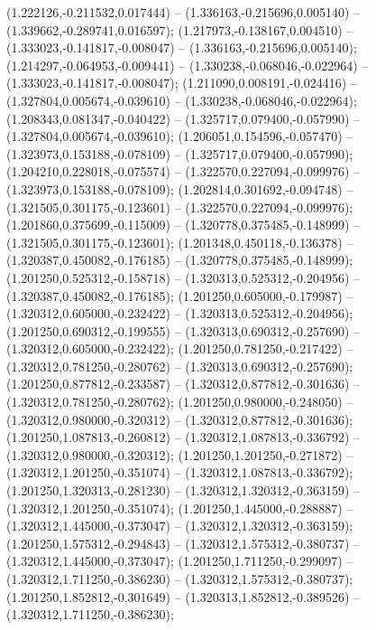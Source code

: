  (1.222126,-0.211532,0.017444) -- (1.336163,-0.215696,0.005140) -- (1.339662,-0.289741,0.016597);
 (1.217973,-0.138167,0.004510) -- (1.333023,-0.141817,-0.008047) -- (1.336163,-0.215696,0.005140);
 (1.214297,-0.064953,-0.009441) -- (1.330238,-0.068046,-0.022964) -- (1.333023,-0.141817,-0.008047);
 (1.211090,0.008191,-0.024416) -- (1.327804,0.005674,-0.039610) -- (1.330238,-0.068046,-0.022964);
 (1.208343,0.081347,-0.040422) -- (1.325717,0.079400,-0.057990) -- (1.327804,0.005674,-0.039610);
 (1.206051,0.154596,-0.057470) -- (1.323973,0.153188,-0.078109) -- (1.325717,0.079400,-0.057990);
 (1.204210,0.228018,-0.075574) -- (1.322570,0.227094,-0.099976) -- (1.323973,0.153188,-0.078109);
 (1.202814,0.301692,-0.094748) -- (1.321505,0.301175,-0.123601) -- (1.322570,0.227094,-0.099976);
 (1.201860,0.375699,-0.115009) -- (1.320778,0.375485,-0.148999) -- (1.321505,0.301175,-0.123601);
 (1.201348,0.450118,-0.136378) -- (1.320387,0.450082,-0.176185) -- (1.320778,0.375485,-0.148999);
 (1.201250,0.525312,-0.158718) -- (1.320313,0.525312,-0.204956) -- (1.320387,0.450082,-0.176185);
 (1.201250,0.605000,-0.179987) -- (1.320312,0.605000,-0.232422) -- (1.320313,0.525312,-0.204956);
 (1.201250,0.690312,-0.199555) -- (1.320313,0.690312,-0.257690) -- (1.320312,0.605000,-0.232422);
 (1.201250,0.781250,-0.217422) -- (1.320312,0.781250,-0.280762) -- (1.320313,0.690312,-0.257690);
 (1.201250,0.877812,-0.233587) -- (1.320312,0.877812,-0.301636) -- (1.320312,0.781250,-0.280762);
 (1.201250,0.980000,-0.248050) -- (1.320312,0.980000,-0.320312) -- (1.320312,0.877812,-0.301636);
 (1.201250,1.087813,-0.260812) -- (1.320312,1.087813,-0.336792) -- (1.320312,0.980000,-0.320312);
 (1.201250,1.201250,-0.271872) -- (1.320312,1.201250,-0.351074) -- (1.320312,1.087813,-0.336792);
 (1.201250,1.320313,-0.281230) -- (1.320312,1.320312,-0.363159) -- (1.320312,1.201250,-0.351074);
 (1.201250,1.445000,-0.288887) -- (1.320312,1.445000,-0.373047) -- (1.320312,1.320312,-0.363159);
 (1.201250,1.575312,-0.294843) -- (1.320312,1.575312,-0.380737) -- (1.320312,1.445000,-0.373047);
 (1.201250,1.711250,-0.299097) -- (1.320312,1.711250,-0.386230) -- (1.320312,1.575312,-0.380737);
 (1.201250,1.852812,-0.301649) -- (1.320313,1.852812,-0.389526) -- (1.320312,1.711250,-0.386230);
